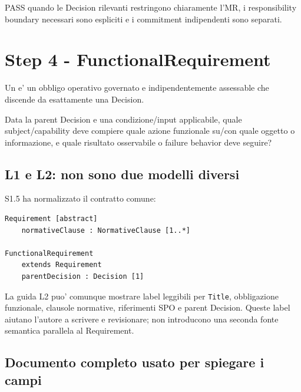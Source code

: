 \documentclass[11pt,a4paper]{article}
\begin{document}
\begin{ddtacheck}[title={Gate D2 - Decision + STOP}]
PASS quando le Decision rilevanti restringono chiaramente l'MR, i responsibility boundary necessari sono espliciti e i commitment indipendenti sono separati.
\end{ddtacheck}

\section{Step 4 - FunctionalRequirement}
\closedtag

Un \FR{} e' un obbligo operativo governato e indipendentemente assessable che discende da esattamente una Decision.

\begin{ddtacheck}[title={Domanda fondamentale}]
Data la parent Decision e una condizione/input applicabile, quale subject/capability deve compiere quale azione funzionale su/con quale oggetto o informazione, e quale risultato osservabile o failure behavior deve seguire?
\end{ddtacheck}

\subsection{L1 e L2: non sono due modelli diversi}

S1.5 ha normalizzato il contratto comune:

\begin{lstlisting}
Requirement [abstract]
    normativeClause : NormativeClause [1..*]

FunctionalRequirement
    extends Requirement
    parentDecision : Decision [1]
\end{lstlisting}

La guida L2 puo' comunque mostrare label leggibili per \texttt{Title}, obbligazione funzionale, clausole normative, riferimenti SPO e parent Decision. Queste label aiutano l'autore a scrivere e revisionare; non introducono una seconda fonte semantica parallela al Requirement.

\subsection{Documento completo usato per spiegare i campi}
\end{document}
